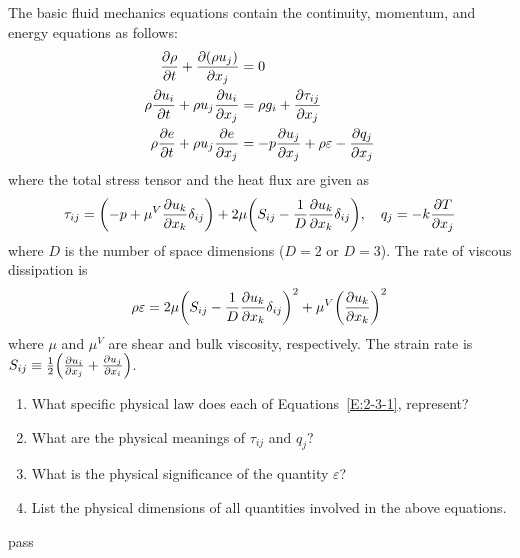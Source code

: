 \begin{homework}[label={H:2-3}]
    The basic fluid mechanics equations contain the continuity, momentum, and energy equations as follows:
    \begin{subequations}\label{E:2-3-1}
        \begin{align}
            \pdv{\rho}{t} + \pdv{(\rho u_j)}{x_j} &= 0 \label{E:2-3-1-a} \\
            \rho\pdv{u_i}{t} + \rho u_j\pdv{u_i}{x_j} &= \rho g_i + \pdv{\tau_{ij}}{x_j} \label{E:2-3-1-b} \\
            \rho\pdv{e}{t} + \rho u_j\pdv{e}{x_j} &= -p\pdv{u_j}{x_j} + \rho\varepsilon - \pdv{q_j}{x_j} \label{E:2-3-1-c}
        \end{align}
    \end{subequations}
    where the total stress tensor and the heat flux are given as
    \begin{equation}\label{E:2-3-2}
        \tau_{ij} = \qty(-p + \mu^V\pdv{u_k}{x_k}\delta_{ij}) + 2\mu\qty(S_{ij} - \frac{1}{D}\pdv{u_k}{x_k}\delta_{ij}),
        \quad
        q_j = -k\pdv{T}{x_j}
    \end{equation}
    where $D$ is the number of space dimensions ($D=2$ or $D=3$). The rate of viscous dissipation is
    \begin{equation}\label{E:2-3-3}
        \rho\varepsilon = 2\mu\qty(S_{ij} - \frac{1}{D}\pdv{u_k}{x_k}\delta_{ij})^2 + \mu^V\qty(\pdv{u_k}{x_k})^2
    \end{equation}
    where $\mu$ and $\mu^V$ are shear and bulk viscosity, respectively. The strain rate is $S_{ij}\equiv\frac{1}{2}\qty(\pdv{u_i}{x_j}+\pdv{u_j}{x_i})$.

    \begin{enumerate}[label=(\alph*)]
        \item What specific physical law does each of Equations~\eqref{E:2-3-1}, represent?
        \item What are the physical meanings of $\tau_{ij}$ and $q_j$?
        \item What is the physical significance of the quantity $\varepsilon$?
        \item List the physical dimensions of all quantities involved in the above equations.
    \end{enumerate}
\end{homework}

pass



